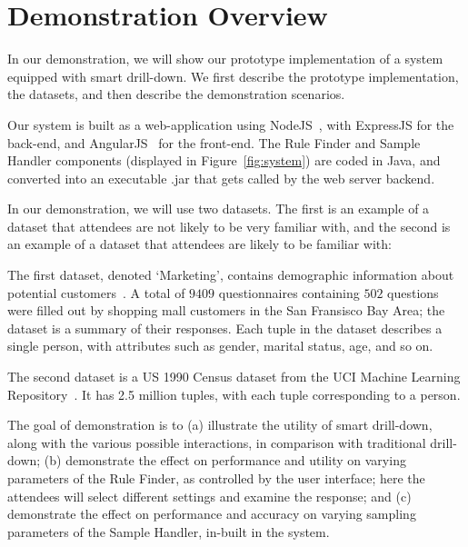 \vspace{-10pt}
\section{Demonstration Overview} \label{sec:demo} 
In our demonstration, we will show our prototype implementation of a system equipped with smart drill-down. We first describe the prototype implementation, the datasets, and then describe the demonstration scenarios.

 Our system is built as a web-application using NodeJS~\cite{nodejs}, with ExpressJS for the back-end, and AngularJS~\cite{angular} for the front-end. The Rule Finder and Sample Handler components (displayed in Figure~\ref{fig:system}) are coded in Java, and converted into an executable .jar that gets called by the web server backend. 

 In our demonstration, we will use two datasets. The first is an example of a dataset that attendees are not likely to be very familiar with, and the second is an example of a dataset that attendees are likely to be familiar with:

The first dataset, denoted `Marketing', contains demographic information about potential customers~\cite{dataset1}. A total of $9409$ questionnaires containing $502$ questions were filled out by shopping mall customers in the San Fransisco Bay Area; the dataset is a summary of their responses. Each tuple in the dataset describes a single person, with attributes such as gender, marital status, age, and so on. 

The second dataset is a US 1990 Census dataset from the UCI Machine Learning Repository~\cite{uciml}. It has 2.5 million tuples, with each tuple corresponding to a person. %


 The goal of demonstration is to (a) illustrate
the utility of smart drill-down, along with the various possible interactions, 
in comparison with traditional drill-down; 
(b) demonstrate the effect on performance and utility on varying parameters of the Rule Finder, as controlled by the user interface; here the attendees will select different settings and examine the response; and
(c) demonstrate the effect on performance and accuracy on varying sampling parameters of the Sample Handler, in-built in the system.   

